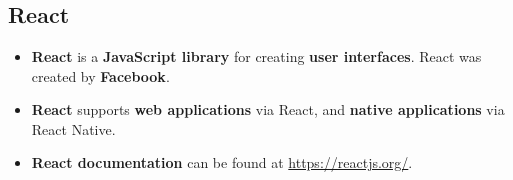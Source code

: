 \documentclass{article}
\begin{document}
    \section*{}

    \subsection*{React}
    \begin{itemize}
        \item \textbf{React} is a \textbf{JavaScript library} for creating \textbf{user interfaces}. React was created by \textbf{Facebook}.
        \item \textbf{React} supports \textbf{web applications} via React, and \textbf{native applications} via React Native.
        \item \textbf{React documentation} can be found at \url{https://reactjs.org/}.
    \end{itemize}
\end{document}
